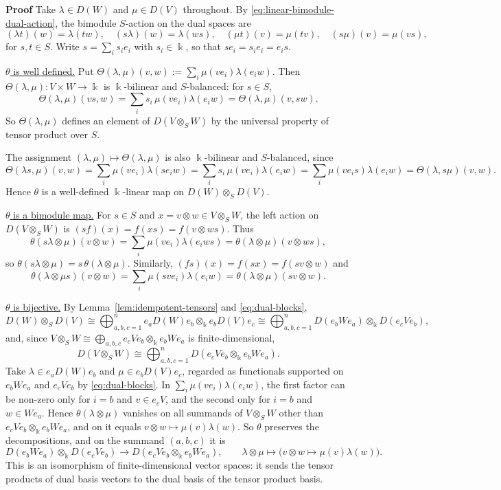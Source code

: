 \begin{supplementary}
\textbf{Proof} \phantom{abc}
Take $\lambda \in D(W)$ and $\mu\in D(V)$ throughout.
By \eqref{eq:linear-bimodule-dual-action}, the bimodule $S$-action on the dual spaces are
\[
(\lambda t)(w)=\lambda(tw),\quad(s\lambda)(w)=\lambda(ws),\quad(\mu t)(v)=\mu(tv),\quad(s\mu)(v)=\mu(vs),
\]
for $s,t\in S$.
Write $s=\sum_is_ie_i$ with $s_i\in\Bbbk$, so that $se_i=s_ie_i=e_is$.

\underline{$\theta$ is well defined.}
Put $\Theta(\lambda,\mu)(v,w):=\sum_i\mu(ve_i)\lambda(e_iw)$.
Then $\Theta(\lambda,\mu):V\times W\to \Bbbk$ is $\Bbbk$-bilinear and $S$-balanced: for $s\in S$,
\[
\Theta(\lambda,\mu)(vs,w)=\sum_is_i\,\mu(ve_i)\lambda(e_iw)=\Theta(\lambda,\mu)(v,sw).
\]
So $\Theta(\lambda,\mu)$ defines an element of $D(V\otimes_SW)$ by the universal property of tensor product over $S$.

The assignment $(\lambda,\mu)\mapsto\Theta(\lambda,\mu)$ is also $\Bbbk$-bilinear and $S$-balanced, since
\[
\Theta(\lambda s,\mu)(v,w)=\sum_i\mu(ve_i)\lambda(se_iw)=\sum_is_i\,\mu(ve_i)\lambda(e_iw)=\sum_i\mu(ve_is)\lambda(e_iw)=\Theta(\lambda,s\mu)(v,w).
\]
Hence $\theta$ is a well-defined $\Bbbk$-linear map on $D(W)\otimes_SD(V)$.

\underline{$\theta$ is a bimodule map.}
For $s\in S$ and $x=v\otimes w\in V\otimes_SW$, the left action on $D(V\otimes_SW)$ is $(sf)(x)=f(xs)=f(v\otimes ws)$.
Thus
\[
\theta(s\lambda\otimes\mu)(v\otimes w)=\sum_i\mu(ve_i)\lambda(e_iws)=\theta(\lambda\otimes\mu)(v\otimes ws),
\]
so $\theta(s\lambda\otimes\mu)=s\,\theta(\lambda\otimes\mu)$.
Similarly, $(fs)(x)=f(sx)=f(sv\otimes w)$ and
\[
\theta(\lambda\otimes\mu s)(v\otimes w)=\sum_i\mu(sve_i)\lambda(e_iw)=\theta(\lambda\otimes\mu)(sv\otimes w).
\]
\end{supplementary}

\underline{$\theta$ is bijective.}
By Lemma~\ref{lem:idempotent-tensors} and \eqref{eq:dual-blocks},
\[
D(W)\otimes_SD(V)\cong\bigoplus_{a,b,c=1}^n e_aD(W)e_b\otimes_\Bbbk e_bD(V)e_c\cong\bigoplus_{a,b,c=1}^nD(e_bWe_a)\otimes_\Bbbk D(e_cVe_b),
\]
and, since $V\otimes_SW\cong\bigoplus_{a,b,c}e_cVe_b\otimes_\Bbbk e_bWe_a$ is finite-dimensional,
\[
D(V\otimes_SW)\cong\bigoplus_{a,b,c=1}^nD(e_cVe_b\otimes_\Bbbk e_bWe_a).
\]
Take $\lambda\in e_aD(W)e_b$ and $\mu\in e_bD(V)e_c$, regarded as functionals supported on $e_bWe_a$ and $e_cVe_b$ by \eqref{eq:dual-blocks}.
In $\sum_i\mu(ve_i)\lambda(e_iw)$, the first factor can be non-zero only for $i=b$ and $v\in e_cV$, and the second only for $i=b$ and $w\in We_a$.
Hence $\theta(\lambda\otimes\mu)$ vanishes on all summands of $V\otimes_SW$ other than $e_cVe_b\otimes_\Bbbk e_bWe_a$, and on it equals $v\otimes w\mapsto\mu(v)\lambda(w)$.
So $\theta$ preserves the decompositions, and on the summand $(a,b,c)$ it is
\[
D(e_bWe_a)\otimes_\Bbbk D(e_cVe_b)\longrightarrow D(e_cVe_b\otimes_\Bbbk e_bWe_a),\qquad\lambda\otimes\mu\longmapsto\bigl(v\otimes w\mapsto\mu(v)\lambda(w)\bigr).
\]
This is an isomorphism of finite-dimensional vector spaces: it sends the tensor products of dual basis vectors to the dual basis of the tensor product basis.

